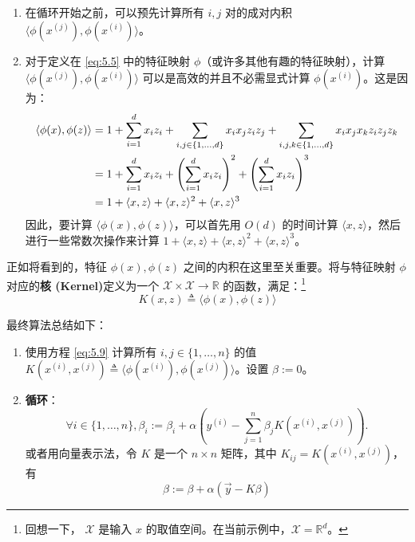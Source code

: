 \begin{enumerate}
    \item 在循环开始之前，可以预先计算所有 $i, j$ 对的成对内积 $\langle \phi(x^{(j)}), \phi(x^{(i)}) \rangle$。
    \item 对于定义在 \eqref{eq:5.5} 中的特征映射 $\phi$（或许多其他有趣的特征映射），计算 $\langle \phi(x^{(j)}), \phi(x^{(i)}) \rangle$ 可以是高效的并且不必需显式计算 $\phi(x^{(i)})$。这是因为：
    \begin{align} 
        \langle \phi(x), \phi(z) \rangle &= 1 + \sum_{i=1}^d x_i z_i + \sum_{i,j \in \{1, \dots, d\}} x_i x_j z_i z_j + \sum_{i,j,k \in \{1, \dots, d\}} x_i x_j x_k z_i z_j z_k \notag\\ 
        &= 1 + \sum_{i=1}^d x_i z_i + \left( \sum_{i=1}^d x_i z_i \right)^2 + \left( \sum_{i=1}^d x_i z_i \right)^3 \notag\\ 
        &= 1 + \langle x, z \rangle + \langle x, z \rangle^2 + \langle x, z \rangle^3 \label{eq:5.9}
    \end{align}
    因此，要计算 $\langle \phi(x), \phi(z) \rangle$，可以首先用 $O(d)$ 的时间计算 $\langle x, z \rangle$，然后进行一些常数次操作来计算 $1 + \langle x, z \rangle + \langle x, z \rangle^2 + \langle x, z \rangle^3$。
\end{enumerate}

正如将看到的，特征 $\phi(x), \phi(z)$ 之间的内积在这里至关重要。将与特征映射 $\phi$ 对应的\textbf{核 (Kernel)}定义为一个 $\mathcal{X} \times \mathcal{X} \to \mathbb{R}$ 的函数，满足：\footnote{回想一下， $\mathcal{X}$ 是输入 $x$ 的取值空间。在当前示例中，$\mathcal{X} = \mathbb{R}^d$。}
\begin{equation}
    K(x, z) \triangleq \langle \phi(x), \phi(z) \rangle
\end{equation}

最终算法总结如下：

\noindent\hrulefill
\begin{enumerate}
    \item 使用方程 \eqref{eq:5.9} 计算所有 $i, j \in \{1, \dots, n\}$ 的值 $K(x^{(i)}, x^{(j)}) \triangleq \langle \phi(x^{(i)}), \phi(x^{(j)}) \rangle$。设置 $\beta := 0$。
    \item \textbf{循环}：
    \begin{equation}
        \forall i \in \{1, \dots, n\}, \beta_i := \beta_i + \alpha \left( y^{(i)} - \sum_{j=1}^n \beta_j K(x^{(i)}, x^{(j)}) \right).
        \label{eq:kernel_algo}
    \end{equation}
    或者用向量表示法，令 $K$ 是一个 $n \times n$ 矩阵，其中 $K_{ij} = K(x^{(i)}, x^{(j)})$，有
    \[
        \beta := \beta + \alpha (\vec{y} - K \beta)
    \]
\end{enumerate}
\hrulefill

